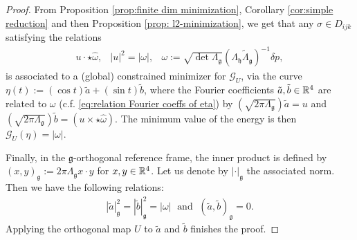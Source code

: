 \begin{proof}
From Proposition \ref{prop:finite dim minimization}, Corollary \ref{cor:simple reduction} and then Proposition \ref{prop: l2-minimization}, we get that any $\sigma \in D_{ijk}$ satisfying the relations
\begin{eqnarray}
 u \cdot \star \hat{\omega}, & |u|^2 = |\omega|, & \omega := \sqrt{\det \Lambda_{\mathfrak{g}}} (\Lambda_{\mathfrak{h}} \tilde{\Lambda}_{\mathfrak{g}})^{-1} \delta p,
\end{eqnarray}
is associated to a (global) constrained minimizer for $\mathcal{G}_{U}$, via the curve $\eta(t) := (\cos t) \tilde{a} + (\sin t) \tilde{b}$, where the Fourier coefficients $\tilde{a}, \tilde{b} \in \mathbb{R}^4$ are related to $\omega$ (c.f. \ref{eq:relation Fourier coeffs of eta}) by $(\sqrt{2 \pi \Lambda_{\mathfrak{g}}}) \tilde{a} = u$ and $(\sqrt{2 \pi \Lambda_{\mathfrak{g}}}) \tilde{b} = (u \times \star\hat{\omega})$. The minimum value of the energy is then $\mathcal{G}_{U}(\eta) = |\omega|$.

Finally, in the $\mathfrak{g}$-orthogonal reference frame, the inner product is defined by $(x, y)_{\mathfrak{g}} := 2 \pi \Lambda_{\mathfrak{g}}x \cdot y$ for $x,y \in \mathbb{R}^4$. Let us denote by $|\cdot|_{\mathfrak{g}}$ the associated norm. Then we have the following relations:
\begin{align}
|\tilde{a}|_{\mathfrak{g}}^2 = |\tilde{b}|_{\mathfrak{g}}^{2} = |\omega| \;  \text{ and } \; (\tilde{a}, \tilde{b})_{\mathfrak{g}} = 0.
\end{align}
Applying the orthogonal map $U$ to $\tilde{a}$ and $\tilde{b}$ finishes the proof.
\end{proof}



